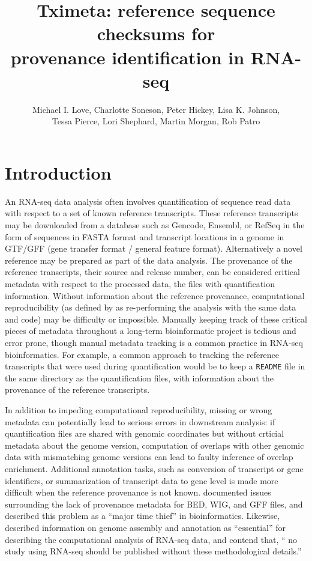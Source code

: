 \documentclass[12pt]{article}
\title{Tximeta: reference sequence checksums for \\ provenance identification in RNA-seq}
\author{Michael I. Love, Charlotte Soneson, Peter Hickey, Lisa K. Johnson, \\
Tessa Pierce, Lori Shephard, Martin Morgan, Rob Patro}
\begin{document}
\maketitle

\section*{Introduction}

An RNA-seq data analysis often involves quantification of sequence read data with respect to a set of known reference transcripts. These reference transcripts may be downloaded from a database such as Gencode, Ensembl, or RefSeq \citep{gencode,ensembl,refseq} in the form of sequences in FASTA format and transcript locations in a genome in GTF/GFF (gene transfer format / general feature format). Alternatively a novel reference may be prepared as part of the data analysis. The provenance of the reference transcripts, their source and release number, can be considered critical metadata with respect to the processed data, the files with quantification information. Without information about the reference provenance, computational reproducibility (as defined by \citet{Patil2016} as re-performing the analysis with the same data and code) may be difficulty or impossible. Manually keeping track of these critical pieces of metadata throughout a long-term bioinformatic project is tedious and error prone, though manual metadata tracking is a common practice in RNA-seq bioinformatics. For example, a common approach to tracking the reference transcripts that were used during quantification would be to keep a \texttt{README} file in the same directory as the quantification files, with information about the provenance of the reference transcripts. 

In addition to impeding computational reproducibility, missing or wrong metadata can potentially lead to serious errors in downstream analysis: if quantification files are shared with genomic coordinates but without crticial metadata about the genome version, computation of overlaps with other genomic data with mismatching genome versions can lead to faulty inference of overlap enrichment. Additional annotation tasks, such as conversion of transcript or gene identifiers, or summarization of transcript data to gene level is made more difficult when the reference provenance is not known. \citet{Kanduri2017} documented issues surrounding the lack of provenance metadata for BED, WIG, and GFF files, and described this problem as a ``major time thief'' in bioinformatics. Likewise, \citet{Simoneau2019} described information on genome assembly and annotation as ``essential'' for describing the computational analysis of RNA-seq data, and contend that, `` no study using RNA-seq should be published without these methodological details.''
\end{document}
